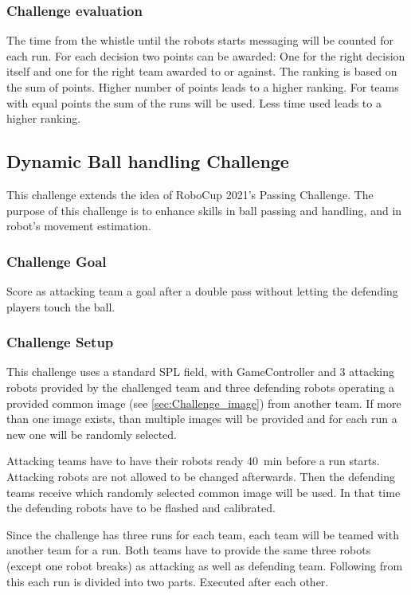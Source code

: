     \subsubsection{Challenge evaluation}
        The time from the whistle until the robots starts messaging will be counted for each run.
        For each decision two points can be awarded: One for the right decision itself and one for the right team awarded to or against.
        The ranking is based on the sum of points. Higher number of points leads to a higher ranking. For teams with equal points the sum of the runs will be used. Less time used leads to a higher ranking.


\subsection{Dynamic Ball handling Challenge}

    This challenge extends the idea of RoboCup 2021's Passing Challenge. The purpose of this challenge is to enhance skills in ball passing and handling, and in robot's movement estimation.

    \subsubsection{Challenge Goal}

        Score as attacking team a goal after a double pass without letting the defending players touch the ball.

    \subsubsection{Challenge Setup}

        This challenge uses a standard SPL field, with GameController and 3 attacking robots provided by the challenged team and three defending robots operating a provided common image (see \cref{sec:Challenge_image}) from another team. If more than one image exists, than multiple images will be provided and for each run a new one will be randomly selected.

        Attacking teams have to have their robots ready \qty{40}{\minute} before a run starts. Attacking robots are not allowed to be changed afterwards. Then the defending teams receive which randomly selected common image will be used. In that time the defending robots have to be flashed and calibrated.

        Since the challenge has three runs for each team, each team will be teamed with another team for a run. Both teams have to provide the same three robots (except one robot breaks) as attacking as well as defending team. Following from this each run is divided into two parts. Executed after each other.


